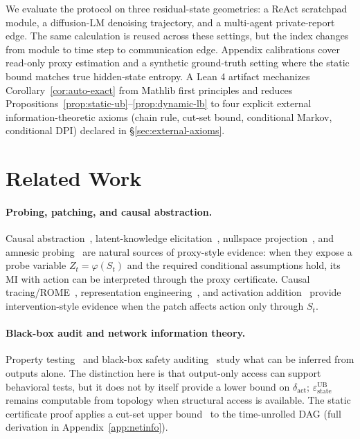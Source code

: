 \documentclass{article}
\begin{document}
We evaluate the protocol on three residual-state geometries: a ReAct scratchpad module, a diffusion-LM denoising trajectory, and a multi-agent private-report edge. The same calculation is reused across these settings, but the index changes from module to time step to communication edge. Appendix calibrations cover read-only proxy estimation and a synthetic ground-truth setting where the static bound matches true hidden-state entropy. A Lean 4 artifact mechanizes Corollary~\ref{cor:auto-exact} from Mathlib first principles and reduces Propositions~\ref{prop:static-ub}--\ref{prop:dynamic-lb} to four explicit external information-theoretic axioms (chain rule, cut-set bound, conditional Markov, conditional DPI) declared in \S\ref{sec:external-axioms}.

\section{Related Work}
\label{sec:related}

\paragraph{Probing, patching, and causal abstraction.}
Causal abstraction~\citep{geiger2021causal}, latent-knowledge elicitation~\citep{burns2022discovering}, nullspace projection~\citep{ravfogel2020null}, and amnesic probing~\citep{elazar2021amnesic} are natural sources of proxy-style evidence: when they expose a probe variable $Z_t = \varphi(S_t)$ and the required conditional assumptions hold, its MI with action can be interpreted through the proxy certificate. Causal tracing/ROME~\citep{meng2022locating}, representation engineering~\citep{zou2023representation}, and activation addition~\citep{turner2023activation} provide intervention-style evidence when the patch affects action only through $S_t$.

\paragraph{Black-box audit and network information theory.}
Property testing~\citep{goldreich1998property} and black-box safety auditing~\citep{casper2024blackbox,su2024mission} study what can be inferred from outputs alone. The distinction here is that output-only access can support behavioral tests, but it does not by itself provide a lower bound on $\delta_\text{act}$; $\varepsilon_\text{state}^\text{UB}$ remains computable from topology when structural access is available. The static certificate proof applies a cut-set upper bound~\citep{elgamal2011network} to the time-unrolled DAG (full derivation in Appendix~\ref{app:netinfo}).
\end{document}
